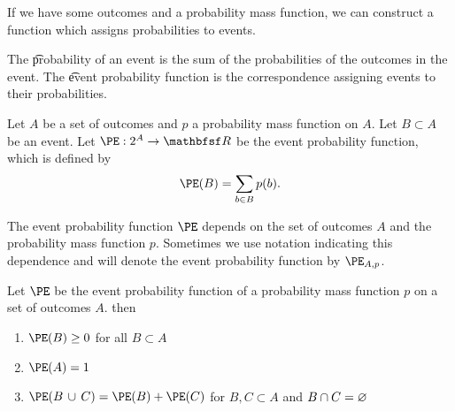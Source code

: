 

If we have some outcomes and a probability mass function, we can construct a function which assigns probabilities to events.


The \t{probability of an event} is the sum of the probabilities of the outcomes in the event.
The \t{event probability function} is the correspondence assigning events to their probabilities.


Let $A$ be a set of outcomes and $p$ a probability mass function on $A$.
Let $B \subset A$ be an event.
Let $\PE: 2^A \to \R$ be the event probability function, which is defined by
\[
  \PE(B) = \sum_{b \in B} p(b).
\]

The event probability function $\PE$ depends on the set of outcomes $A$ and the probability mass function $p$.
Sometimes we use notation indicating this dependence and will denote the event probability function by $\PE_{A, p}$.


\begin{prop}
Let $\PE$ be the event probability function
of a probability mass function $p$ on a set
of outcomes $A$. then
\begin{enumerate}
\item $\PE(B) \geq 0$ for all $B \subset A$
\item $\PE(A) = 1$
\item
  $\PE(B \union C) = \PE(B) + \PE(C)$
  for $B, C \subset A$ and $B \cap C = \varnothing$
\end{enumerate}
\end{prop}


